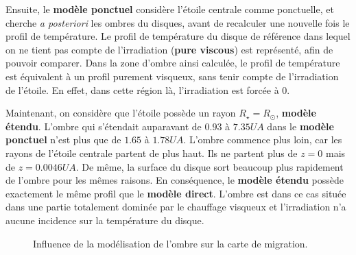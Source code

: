 Ensuite, le \textbf{modèle ponctuel} considère l'étoile centrale comme ponctuelle, et cherche \textit{a posteriori} les ombres du disques, avant de recalculer une nouvelle fois le profil de température. Le profil de température du disque de référence dans lequel on ne tient pas compte de l'irradiation (\textbf{pure viscous}) est représenté, afin de pouvoir comparer. Dans la zone d'ombre ainsi calculée, le profil de température est équivalent à un profil purement visqueux, sans tenir compte de l'irradiation de l'étoile. En effet, dans cette région là, l'irradiation est forcée à 0. 

Maintenant, on considère que l'étoile possède un rayon $R_\star=R_\odot$, \textbf{modèle étendu}. L'ombre qui s'étendait auparavant de $0.93$ à $7.35\unit{UA}$ dans le \textbf{modèle ponctuel} n'est plus que de $1.65$ à $1.78\unit{UA}$. L'ombre commence plus loin, car les rayons de l'étoile centrale partent de plus haut. Ils ne partent plus de $z=0$ mais de $z=0.0046\unit{UA}$. De même, la surface du disque sort beaucoup plus rapidement de l'ombre pour les mêmes raisons. En conséquence, le \textbf{modèle étendu} possède exactement le même profil que le \textbf{modèle direct}. L'ombre est dans ce cas située dans une partie totalement dominée par le chauffage visqueux et l'irradiation n'a aucune incidence sur la température du disque. 

\begin{figure}[htbp]
\centering
{}\hfill
{}

\caption{Influence de la modélisation de l'ombre sur la carte de migration.  }\label{fig:map_shadow_effect}
\end{figure}

